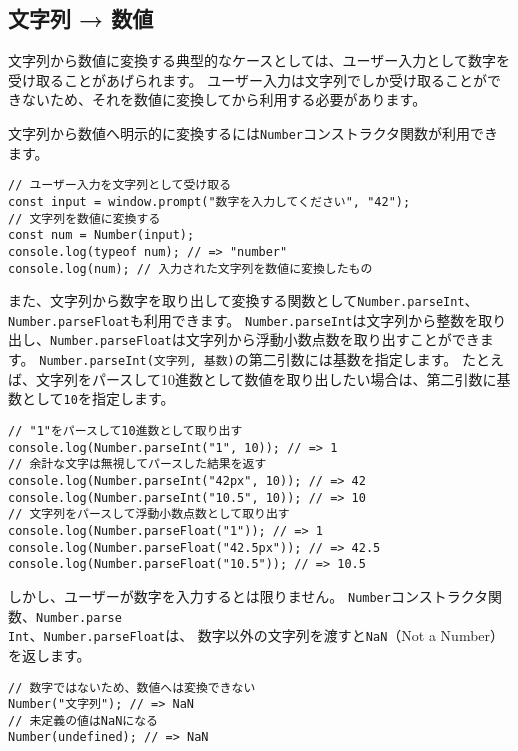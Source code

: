\hypertarget{string-to-number}{%
\subsection{文字列 → 数値}\label{string-to-number}}

文字列から数値に変換する典型的なケースとしては、ユーザー入力として数字を受け取ることがあげられます。
ユーザー入力は文字列でしか受け取ることができないため、それを数値に変換してから利用する必要があります。

文字列から数値へ明示的に変換するには\texttt{Number}コンストラクタ関数が利用できます。

\begin{lstlisting}
// ユーザー入力を文字列として受け取る
const input = window.prompt("数字を入力してください", "42");
// 文字列を数値に変換する
const num = Number(input);
console.log(typeof num); // => "number"
console.log(num); // 入力された文字列を数値に変換したもの
\end{lstlisting}

また、文字列から数字を取り出して変換する関数として\texttt{Number.parseInt}、\texttt{Number.parseFloat}も利用できます。
\texttt{Number.parseInt}は文字列から整数を取り出し、\texttt{Number.parseFloat}は文字列から浮動小数点数を取り出すことができます。
\texttt{Number.parseInt(文字列, 基数)}の第二引数には基数を指定します。
たとえば、文字列をパースして10進数として数値を取り出したい場合は、第二引数に基数として\texttt{10}を指定します。

\begin{lstlisting}
// "1"をパースして10進数として取り出す
console.log(Number.parseInt("1", 10)); // => 1
// 余計な文字は無視してパースした結果を返す
console.log(Number.parseInt("42px", 10)); // => 42
console.log(Number.parseInt("10.5", 10)); // => 10
// 文字列をパースして浮動小数点数として取り出す
console.log(Number.parseFloat("1")); // => 1
console.log(Number.parseFloat("42.5px")); // => 42.5
console.log(Number.parseFloat("10.5")); // => 10.5
\end{lstlisting}

しかし、ユーザーが数字を入力するとは限りません。
\texttt{Number}コンストラクタ関数、\texttt{Number.parse\\Int}、\texttt{Number.parseFloat}は、
数字以外の文字列を渡すと\texttt{NaN}（Not a
Number）を返します。

\begin{lstlisting}
// 数字ではないため、数値へは変換できない
Number("文字列"); // => NaN
// 未定義の値はNaNになる
Number(undefined); // => NaN
\end{lstlisting}

